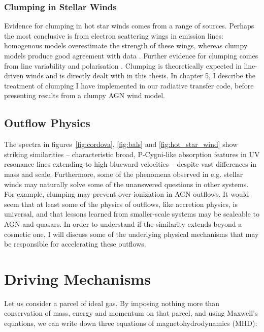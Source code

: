 \subsubsection{Clumping in Stellar Winds}

\label{sec:clumpy_stellar}

Evidence for clumping in hot star winds comes from a range of sources.
Perhaps the most conclusive is from electron scattering wings
in emission lines: homogenous models overestimate the strength of these
wings, whereas clumpy models produce good agreement with data 
\citep{hillier1984,hillier1991eswingsmodel,hamann1992wr,hamann1994,schmutz1997}.
Further evidence for clumping comes from line variability \citep{prinja1992}
and polarisation \citep{brown1995}. Clumping is theoretically expected
in line-driven winds 
\citep[see section~\ref{sec:line_driving} and the review by][]{owocki2014} 
and is directly dealt with in this thesis.
In chapter 5, I describe the treatment of clumping I have implemented 
in our radiative transfer code, before presenting
results from a clumpy AGN wind model.

\subsection{Outflow Physics}

The spectra in figures~\ref{fig:cordova}, \ref{fig:bals}
and \ref{fig:hot_star_wind} show striking similarities -- 
characteristic broad, P-Cygni-like absorption features in UV resonance
lines extending to high blueward velocities -- 
despite vast differences in mass and scale. 
Furthermore, some of the phenomena observed in e.g. stellar winds may 
naturally solve some of 
the unanswered questions in other systems. For example, clumping
may prevent over-ionization in AGN outflows. It would seem
that at least some of the physics of outflows, like accretion physics,
is universal, and that lessons learned from smaller-scale systems may be
scaleable to AGN and quasars. In order to understand if the similarity extends beyond
a cosmetic one, I will discuss some of the 
underlying physical mechanisms that may be responsible for accelerating
these outflows.

\section{Driving Mechanisms}

Let us consider a parcel of ideal gas. By imposing nothing more than
conservation of mass, energy and momentum on that parcel, and using 
Maxwell's equations, we can write down 
three equations of magnetohydrodynamics (MHD):

